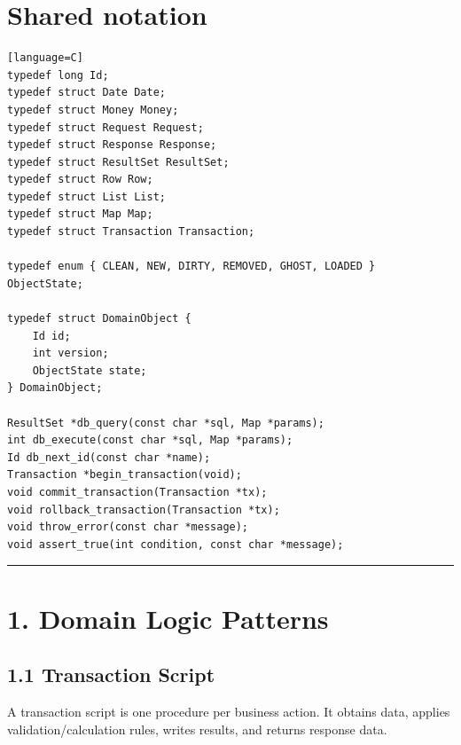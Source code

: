 \documentclass[11pt]{article}
\begin{document}
\section{Shared notation}\label{shared-notation}

\begin{verbatim}[language=C]
typedef long Id;
typedef struct Date Date;
typedef struct Money Money;
typedef struct Request Request;
typedef struct Response Response;
typedef struct ResultSet ResultSet;
typedef struct Row Row;
typedef struct List List;
typedef struct Map Map;
typedef struct Transaction Transaction;

typedef enum { CLEAN, NEW, DIRTY, REMOVED, GHOST, LOADED } ObjectState;

typedef struct DomainObject {
    Id id;
    int version;
    ObjectState state;
} DomainObject;

ResultSet *db_query(const char *sql, Map *params);
int db_execute(const char *sql, Map *params);
Id db_next_id(const char *name);
Transaction *begin_transaction(void);
void commit_transaction(Transaction *tx);
void rollback_transaction(Transaction *tx);
void throw_error(const char *message);
void assert_true(int condition, const char *message);
\end{verbatim}

\begin{center}\rule{0.5\linewidth}{0.5pt}\end{center}

\section{1. Domain Logic Patterns}\label{domain-logic-patterns}

\subsection{1.1 Transaction Script}\label{transaction-script}

A transaction script is one procedure per business action. It obtains
data, applies validation/calculation rules, writes results, and returns
response data.
\end{document}
